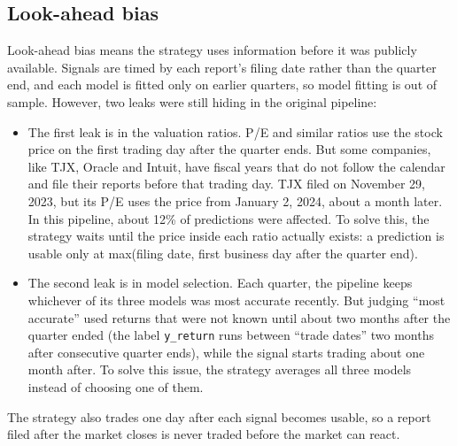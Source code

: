 \documentclass[10pt]{article}
\begin{document}
\subsection{Look-ahead bias}
Look-ahead bias means the strategy uses information before it was publicly available. Signals are
timed by each report's filing date rather than the quarter end, and each model is fitted only on
earlier quarters, so model fitting is out of sample. However, two leaks were still hiding in the
original pipeline:
\begin{itemize}\setlength{\itemsep}{1pt}
\item The first leak is in the valuation ratios. P/E and similar ratios use the stock price on the
first trading day after the quarter ends. But some companies, like TJX, Oracle and Intuit, have fiscal
years that do not follow the calendar and file their reports before that trading day. TJX filed on
November 29, 2023, but its P/E uses the price from January 2, 2024, about a month later. In this
pipeline, about 12\% of predictions were affected. To solve this, the strategy waits until the price
inside each ratio actually exists: a prediction is usable only at max(filing date, first business day
after the quarter end).
\item The second leak is in model selection. Each quarter, the pipeline keeps whichever of its three
models was most accurate recently. But judging ``most accurate'' used returns that were not known until
about two months after the quarter ended (the label \texttt{y\_return} runs between ``trade dates'' two
months after consecutive quarter ends), while the signal starts trading about one month after. To
solve this issue, the strategy averages all three models instead of choosing one of them.
\end{itemize}
The strategy also trades one day after each signal becomes usable, so a report filed after the market
closes is never traded before the market can react.
\end{document}
